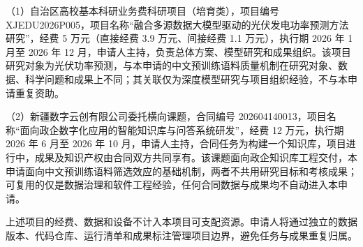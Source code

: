 \justifying
\NSFCBodyText

（1）自治区高校基本科研业务费科研项目（培育类），项目编号 XJEDU2026P005，项目名称“融合多源数据大模型驱动的光伏发电功率预测方法研究”，经费 5 万元（直接经费 3.9 万元、间接经费 1.1 万元），执行期 2026 年 1 月至 2026 年 12 月，申请人主持，负责总体方案、模型研究和成果组织。该项目研究对象为光伏功率预测，与本申请的中文预训练语料质量机制在研究对象、数据、科学问题和成果上不同；其关联仅为深度模型研究与项目组织经验，不与本申请重复资助。

（2）新疆数字云创有限公司委托横向课题，合同编号 202604140013，项目名称“面向政企数字化应用的智能知识库与问答系统研发”，经费 12 万元，执行期 2026 年 6 月至 2026 年 10 月，申请人主持，合同任务为构建一个知识库，项目进行中，成果及知识产权由合同双方共同享有。该课题面向政企知识库工程交付，本申请面向中文预训练语料筛选效应的基础机制，两者不共用研究目标和考核成果；可复用的仅是数据治理和软件工程经验，任何合同数据与成果均不自动进入本申请。

上述项目的经费、数据和设备不计入本项目可支配资源。申请人将通过独立的数据版本、代码仓库、运行清单和成果标注管理项目边界，避免任务与成果重复归属。
